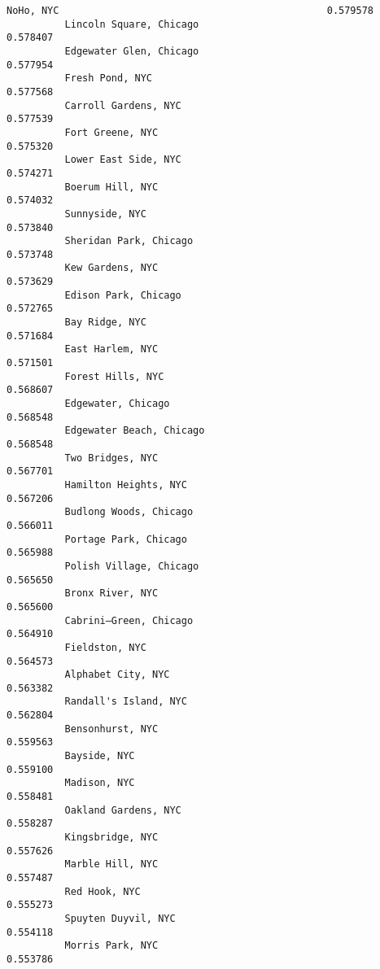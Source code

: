 \documentclass[11pt]{article}
\begin{document}
\begin{Verbatim}[commandchars=\\\{\}]
          NoHo, NYC                                              0.579578
          Lincoln Square, Chicago                                0.578407
          Edgewater Glen, Chicago                                0.577954
          Fresh Pond, NYC                                        0.577568
          Carroll Gardens, NYC                                   0.577539
          Fort Greene, NYC                                       0.575320
          Lower East Side, NYC                                   0.574271
          Boerum Hill, NYC                                       0.574032
          Sunnyside, NYC                                         0.573840
          Sheridan Park, Chicago                                 0.573748
          Kew Gardens, NYC                                       0.573629
          Edison Park, Chicago                                   0.572765
          Bay Ridge, NYC                                         0.571684
          East Harlem, NYC                                       0.571501
          Forest Hills, NYC                                      0.568607
          Edgewater, Chicago                                     0.568548
          Edgewater Beach, Chicago                               0.568548
          Two Bridges, NYC                                       0.567701
          Hamilton Heights, NYC                                  0.567206
          Budlong Woods, Chicago                                 0.566011
          Portage Park, Chicago                                  0.565988
          Polish Village, Chicago                                0.565650
          Bronx River, NYC                                       0.565600
          Cabrini–Green, Chicago                                 0.564910
          Fieldston, NYC                                         0.564573
          Alphabet City, NYC                                     0.563382
          Randall's Island, NYC                                  0.562804
          Bensonhurst, NYC                                       0.559563
          Bayside, NYC                                           0.559100
          Madison, NYC                                           0.558481
          Oakland Gardens, NYC                                   0.558287
          Kingsbridge, NYC                                       0.557626
          Marble Hill, NYC                                       0.557487
          Red Hook, NYC                                          0.555273
          Spuyten Duyvil, NYC                                    0.554118
          Morris Park, NYC                                       0.553786

\end{Verbatim}
\end{document}
